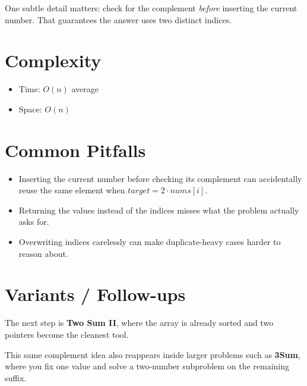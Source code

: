 One subtle detail matters: check for the complement \emph{before} inserting the current number. That guarantees the answer uses two distinct indices.

\section{Complexity}
\begin{itemize}
\item Time: \(O(n)\) average
\item Space: \(O(n)\)
\end{itemize}

\section{Common Pitfalls}
\begin{itemize}
\item Inserting the current number before checking its complement can accidentally reuse the same element when \(target = 2 \cdot nums[i]\).
\item Returning the values instead of the indices misses what the problem actually asks for.
\item Overwriting indices carelessly can make duplicate-heavy cases harder to reason about.
\end{itemize}

\section{Variants / Follow-ups}
The next step is \textbf{Two Sum II}, where the array is already sorted and two pointers become the cleanest tool.

This same complement idea also reappears inside larger problems such as \textbf{3Sum}, where you fix one value and solve a two-number subproblem on the remaining suffix.
